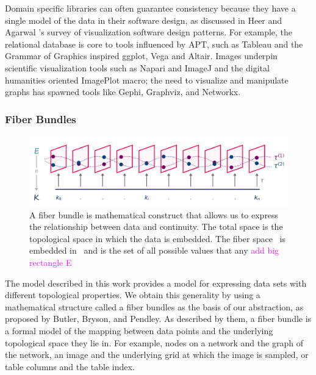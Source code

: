 \documentclass[10pt,journal,compsoc]{IEEEtran}
\newcommand{\note}[1]{\textcolor{magenta}{#1}}
\theoremstyle{definition}
\theoremstyle{remark}
\begin{document}
Domain specific libraries can often guarantee consistency because they have a single model of the data in their software design, as discussed in Heer and Agarwal \cite{HeerSoftware2006}'s survey of visualization software design patterns. For example, the relational database is core to tools influenced by APT, such as Tableau\cite{StoltePolaris2002,hanrahanVizQL2006,MackinlayShowme2007} and the Grammar of Graphics\cite{wilkinsonGrammarGraphics2005} inspired ggplot\cite{wickhamGgplot2ElegantGraphics2016a}, Vega\cite{satyanarayanDeclarativeInteractionDesign2014} and Altair\cite{vanderplasAltairInteractiveStatistical2018}. Images underpin scientific visualization tools such as Napari\cite{nicholas_sofroniew_2021_4533308} and ImageJ\cite{schneiderNIHImageImageJ2012} and the digital humanities oriented ImagePlot\cite{studiesCulturevisImageplot2021} macro; the need to visualize and manipulate graphs has spawned tools like Gephi\cite{bastianGephiOpenSource2009}, Graphviz\cite{ellsonGraphvizOpenSource2002}, and Networkx\cite{HagbergExploringNetwork2008}. 
 
\subsubsection{Fiber Bundles}
\label{sec:related-work:fiber-bundles}
\begin{figure}[h!]
  \includegraphics[width=\columnwidth]{fiberbundle.png}
  \caption{A fiber bundle is mathematical construct that allows us to express the relationship between data and continuity. The \textcolor{total}{total} space \dtotal is the topological space in which the data is embedded. The \textcolor{fiber}{fiber} space \dfiber\ is embedded in \dtotal\ and is the set of all possible values that any
  \note{add big rectangle E}}
  \label{fig:related-work:fiber-bundle}
\end{figure}

The model described in this work provides a model for expressing data sets with different topological properties. 
We obtain this generality by using a mathematical structure called a fiber bundles as the basis of our abstraction, as proposed by Butler, Bryson, and Pendley\cite{butlerVisualizationModelBased1989,
butlerVectorBundleClassesForm1992}. As described by them, a fiber bundle is a formal model of the mapping between data points and the underlying topological space they lie in. For example, nodes on a network and the graph of the network, an image and the underlying grid at which the image is sampled, or table columns and the table index.
\end{document}
